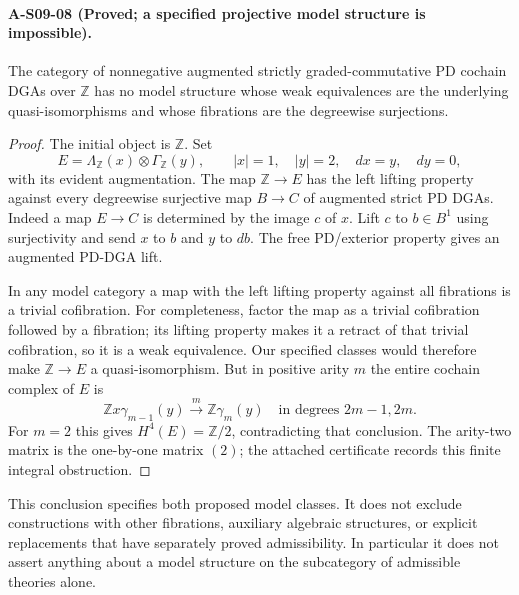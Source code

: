 \paragraph{A-S09-08 (Proved; a specified projective model structure is impossible).}
The category of nonnegative augmented strictly graded-commutative
PD cochain DGAs over $\mathbb Z$ has no model structure whose
weak equivalences are the underlying quasi-isomorphisms and whose
fibrations are the degreewise surjections.

\begin{proof}
The initial object is $\mathbb Z$.  Set
\[
 E=\Lambda_{\mathbb Z}(x)\otimes\Gamma_{\mathbb Z}(y),
 \qquad |x|=1,\quad |y|=2,\quad dx=y,\quad dy=0,
\]
with its evident augmentation.  The map $\mathbb Z\to E$ has
the left lifting property against every degreewise surjective
map $B\to C$ of augmented strict PD DGAs.  Indeed a map $E\to C$
is determined by the image $c$ of $x$.  Lift $c$ to $b\in B^1$
using surjectivity and send $x$ to $b$ and $y$ to $db$.
The free PD/exterior property gives an augmented PD-DGA lift.

In any model category a map with the left lifting property against
all fibrations is a trivial cofibration.  For completeness, factor
the map as a trivial cofibration followed by a fibration; its lifting
property makes it a retract of that trivial cofibration, so it is
a weak equivalence.  Our specified classes would therefore make
$\mathbb Z\to E$ a quasi-isomorphism.  But in positive arity $m$
the entire cochain complex of $E$ is
\[
 \mathbb Z x\gamma_{m-1}(y)
 \xrightarrow{\ m\ }\mathbb Z\gamma_m(y)
 \quad\text{in degrees }2m-1,2m.
\]
For $m=2$ this gives $H^4(E)=\mathbb Z/2$, contradicting that
conclusion.  The arity-two matrix is the one-by-one matrix $(2)$;
the attached certificate records this finite integral obstruction.
\end{proof}

This conclusion specifies both proposed model classes.  It does
not exclude constructions with other fibrations, auxiliary algebraic
structures, or explicit replacements that have separately proved
admissibility.  In particular it does not assert anything about a
model structure on the subcategory of admissible theories alone.

